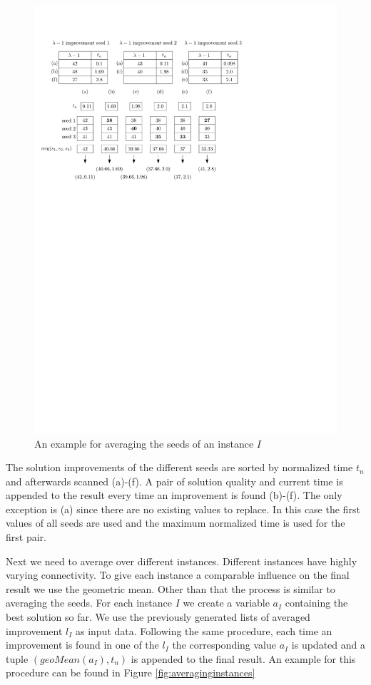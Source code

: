 \documentclass[a4paper,12pt,titlepage, BCOR7mm,headsepline]{scrbook}
\numberwithin{equation}{section}
\begin{document}
\begin{figure}[H] 
    
  \begin{center}
   \includegraphics[width=.9\textwidth]{Ipe/seed_averaging_example.pdf}
  \caption{An example for averaging the seeds of an instance $I$}\label{fig:averagingseeds} %
  \end{center}
    
\end{figure}
The solution improvements of the different seeds are sorted by normalized time $t_n$ and afterwards scanned (a)-(f). A pair of solution quality and current time is appended to the result every time an improvement is found (b)-(f). The only exception is (a) since there are no existing values to replace. In this case the first values of all seeds are used and the maximum normalized time is used for the first pair.


Next we need to average over different instances. Different instances have highly varying connectivity. To give each instance a comparable influence on the final result we use the geometric mean. Other than that the process is similar to averaging the seeds. For each instance $I$ we create a variable $a_I$ containing the best solution so far. We use the previously generated lists of averaged improvement $l_I$ as input data. Following the same procedure, each time an improvement is found in one of the $l_I$ the corresponding value $a_I$ is updated and a tuple $(geoMean(a_I), t_n)$ is appended to the final result. An example for this procedure can be found in Figure \ref{fig:averaginginstances}
\end{document}
